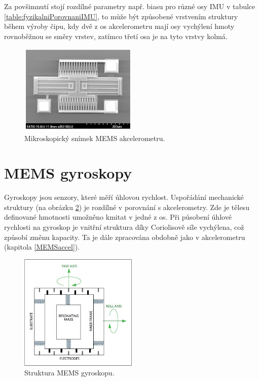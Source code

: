 Za povšimnutí stojí rozdílné parametry např. biasu pro různé osy \ac{IMU} v tabulce \ref{table:fyzikalniPorovnaniIMU}, to může být způsobené vrstvením struktury během výroby čipu, kdy dvě z os akcelerometru mají osy vychýlení hmoty rovnoběžnou se směry vrstev, zatímco třetí osa je na tyto vrstvy kolmá.

\begin{figure}[h]
    \centering
    \includegraphics[width=0.5\textwidth]{obrazky/MEMSaccelerometerPhoto}
    \caption{Mikroskopický snímek MEMS akcelerometru. \cite{cCumN04KaPNjERaF}}
    \label{fig:MEMSaccelerometerPhoto}
\end{figure}

\section{MEMS gyroskopy}
Gyroskopy jsou senzory, které měří úhlovou rychlost. Uspořádání mechanické struktury (na obrázku \ref{fig:MEMSgyroscope}) je rozdílné v porovnání s akcelerometry. Zde je tělesu definované hmotnosti umožněno kmitat v jedné z os. Při působení úhlové rychlosti na gyroskop je vnitřní struktura díky Coriolisově síle vychýlena, což způsobí změnu kapacity. Ta je dále zpracována obdobně jako v akcelerometru (kapitola \ref{MEMSaccel}). \cite{Tittertonc2004} \cite{Dadafshar2014}
\begin{figure}[h]
    \centering
    \includegraphics[width=0.5\textwidth]{obrazky/MEMSgyroscope}
    \caption{Struktura MEMS gyroskopu. \cite{Dadafshar2014}}
    \label{fig:MEMSgyroscope}
\end{figure}
